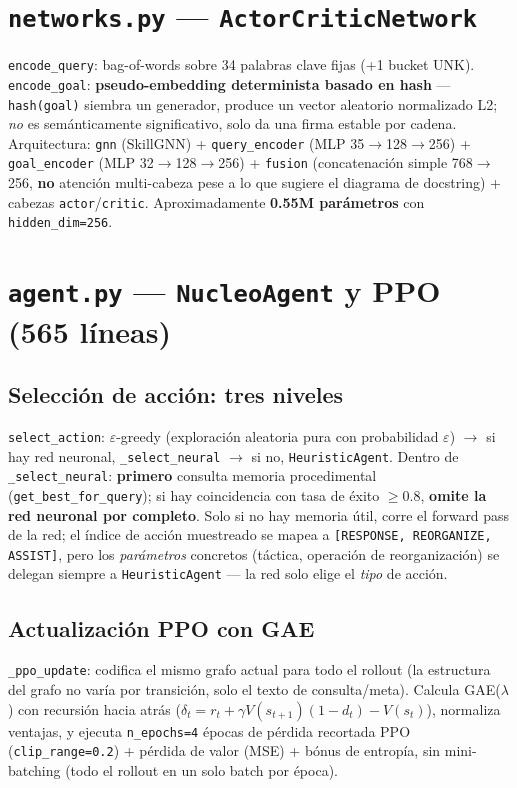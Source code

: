 \documentclass[11pt,a4paper]{report}
\newcommand{\code}[1]{\texttt{#1}}
\begin{document}
\section{\code{networks.py} --- \code{ActorCriticNetwork}}

\code{encode_query}: bag-of-words sobre 34 palabras clave fijas (+1 bucket UNK). \code{encode_goal}: \textbf{pseudo-embedding determinista basado en hash} --- \code{hash(goal)} siembra un generador, produce un vector aleatorio normalizado L2; \emph{no} es sem\'anticamente significativo, solo da una firma estable por cadena. Arquitectura: \code{gnn} (SkillGNN) + \code{query\_encoder} (MLP 35$\to$128$\to$256) + \code{goal\_encoder} (MLP 32$\to$128$\to$256) + \code{fusion} (concatenaci\'on simple 768$\to$256, \textbf{no} atenci\'on multi-cabeza pese a lo que sugiere el diagrama de docstring) + cabezas \code{actor}/\code{critic}. Aproximadamente \textbf{0.55M par\'ametros} con \code{hidden\_dim=256}.

\section{\code{agent.py} --- \code{NucleoAgent} y PPO (565 l\'ineas)}

\subsection{Selecci\'on de acci\'on: tres niveles}
\code{select_action}: $\varepsilon$-greedy (exploraci\'on aleatoria pura con probabilidad $\varepsilon$) $\to$ si hay red neuronal, \code{\_select_neural} $\to$ si no, \code{HeuristicAgent}. Dentro de \code{\_select_neural}: \textbf{primero} consulta memoria procedimental (\code{get_best_for_query}); si hay coincidencia con tasa de \'exito $\ge0.8$, \textbf{omite la red neuronal por completo}. Solo si no hay memoria \'util, corre el forward pass de la red; el \'indice de acci\'on muestreado se mapea a \code{[RESPONSE, REORGANIZE, ASSIST]}, pero los \emph{par\'ametros} concretos (t\'actica, operaci\'on de reorganizaci\'on) se delegan siempre a \code{HeuristicAgent} --- la red solo elige el \emph{tipo} de acci\'on.

\subsection{Actualizaci\'on PPO con GAE}
\code{\_ppo_update}: codifica el mismo grafo actual para todo el rollout (la estructura del grafo no var\'ia por transici\'on, solo el texto de consulta/meta). Calcula GAE($\lambda$) con recursi\'on hacia atr\'as ($\delta_t=r_t+\gamma V(s_{t+1})(1-d_t)-V(s_t)$), normaliza ventajas, y ejecuta \code{n\_epochs=4} \'epocas de p\'erdida recortada PPO (\code{clip\_range=0.2}) + p\'erdida de valor (MSE) + b\'onus de entrop\'ia, sin mini-batching (todo el rollout en un solo batch por \'epoca).
\end{document}
